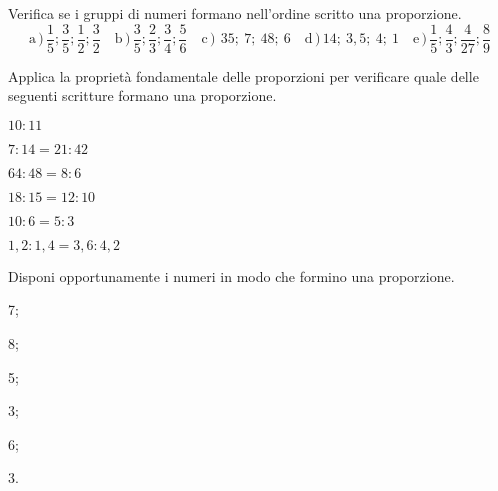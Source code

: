 
\begin{esercizio}
 \label{ese:3.115}
Verifica se i gruppi di numeri formano nell'ordine scritto una proporzione.
\[
\text{a}\,)\,\frac{1}{5}; \frac{3}{5}; \frac{1}{2}; \frac{3}{2}\quad
\text{b}\,)\,\frac{3}{5}; \frac{2}{3}; \frac{3}{4}; \frac{5}{6}\quad
\text{c}\,)\,~35;~7;~48;~6\quad
\text{d}\,)\,14;~3,5;~4;~1\quad
\text{e}\,)\,\frac{1}{5}; \frac{4}{3}; \frac{4}{27}; \frac{8}{9}
\]
\end{esercizio}

\begin{esercizio}
\label{ese:3.116}
Applica la proprietà fondamentale delle proporzioni per verificare quale 
delle seguenti scritture formano una proporzione.

\begin{htmulticols}{2}
\TabPositions{3.7cm}
\begin{enumeratees}
\spazielenx
\item \(10:11 \) \tab\sino 
\item \(7:14 =21:42\) \tab\sino
\item \(64:48 =8:6\) \tab\sino
\item \(18:15 =12:10\) \tab\sino
\item \(10:6 =5:3\) \tab\sino
\item \(1,2:1,4 =3,6:4,2\) \tab\sino
\end{enumeratees}
\end{htmulticols}
\end{esercizio}

\begin{esercizio}
 \label{ese:3.117}
Disponi opportunamente i numeri in modo che formino una proporzione.

\begin{htmulticols}{3}
\begin{enumeratees}
\item 7;
\item 8;
\item 5;
\item 3;
\item 6;
\item 3.
\end{enumeratees}
 \end{htmulticols}
\end{esercizio}

